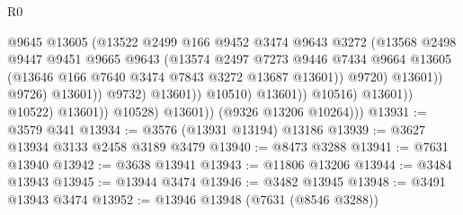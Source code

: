 \begin{lexlean}{R0}
\begin{coremodule}
                                              @9645
                                              @13605
                                              (@13522
                                                @2499
                                                @166
                                                @9452
                                                @3474
                                                @9643
                                                @3272
                                                (@13568
                                                  @2498
                                                  @9447
                                                  @9451
                                                  @9665
                                                  @9643
                                                  (@13574
                                                    @2497
                                                    @7273
                                                    @9446
                                                    @7434
                                                    @9664
                                                    @13605
                                                    (@13646
                                                      @166
                                                      @7640
                                                      @3474
                                                      @7843
                                                      @3272
                                                      @13687
                                                      @13601))
                                                  @9720)
                                                @13601))
                                            @9726)
                                          @13601))
                                      @9732)
                                    @13601))
                                @10510)
                              @13601))
                          @10516)
                        @13601))
                    @10522)
                  @13601))
              @10528)
            @13601))
        (@9326 @13206 @10264)))
@13931 := @3579 @341
@13934 := @3576 (@13931 @13194) @13186
@13939 := @3627 @13934 @3133 @2458 @3189 @3479
@13940 := @8473 @3288
@13941 := @7631 @13940
@13942 := @3638 @13941
@13943 := @11806 @13206
@13944 := @3484 @13943
@13945 := @13944 @3474
@13946 := @3482 @13945
@13948 := @3491 @13943 @3474
@13952 := @13946 @13948 (@7631 (@8546 @3288))

\end{coremodule}
\end{lexlean}
